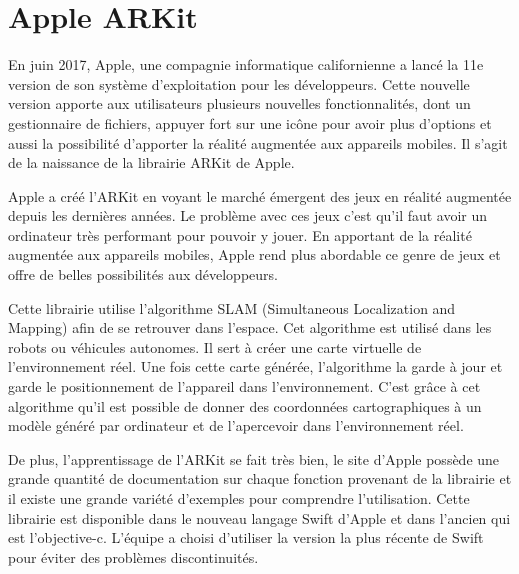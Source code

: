 \documentclass[rapport.tex]{subfiles}
\begin{document}
\section*{Apple ARKit}
En juin 2017, Apple, une compagnie informatique californienne a lancé la 11e version de son système d’exploitation pour les développeurs. Cette nouvelle version apporte aux utilisateurs plusieurs nouvelles fonctionnalités, dont un gestionnaire de fichiers, appuyer fort sur une icône pour avoir plus d’options et aussi la possibilité d’apporter la réalité augmentée aux appareils mobiles. Il s’agit de la naissance de la librairie ARKit de Apple. \citep{cloverJ01}
\par
Apple a créé l’ARKit en voyant le marché émergent des jeux en réalité augmentée depuis les dernières années. Le problème avec ces jeux c’est qu’il faut avoir un ordinateur très performant pour pouvoir y jouer. En apportant de la réalité augmentée aux appareils mobiles, Apple rend plus abordable ce genre de jeux et offre de belles possibilités aux développeurs.
\par
Cette librairie utilise l’algorithme SLAM (Simultaneous Localization and Mapping) afin de se retrouver dans l’espace. Cet algorithme est utilisé dans les robots ou véhicules autonomes. Il sert à créer une carte virtuelle de l’environnement réel. Une fois cette carte générée, l’algorithme la garde à jour et garde le positionnement de l’appareil dans l’environnement. C’est grâce à cet algorithme qu’il est possible de donner des coordonnées cartographiques à un modèle généré par ordinateur et de l’apercevoir dans l’environnement réel. \citep*{Thrun2008}
\par
De plus, l’apprentissage de l’ARKit se fait très bien, le site d’Apple possède une grande quantité de documentation sur chaque fonction provenant de la librairie et il existe une grande variété d’exemples pour comprendre l’utilisation. Cette librairie est disponible dans le nouveau langage Swift d’Apple et dans l’ancien qui est l’objective-c. L’équipe a choisi d’utiliser la version la plus récente de Swift pour éviter des problèmes discontinuités.
\end{document}
